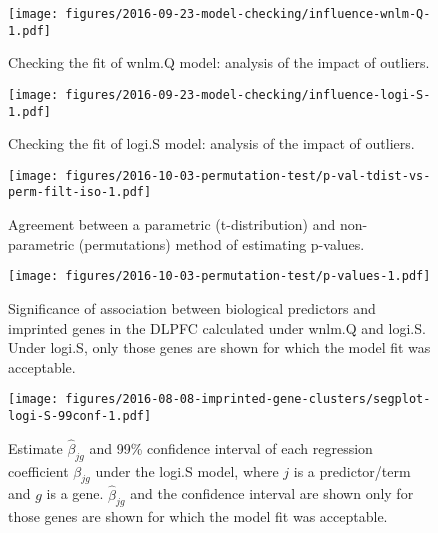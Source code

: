 \documentclass[letterpaper]{article}
\begin{document}
\begin{figure}[h]
\begin{center}
\texttt{[image: figures/2016-09-23-model-checking/influence-wnlm-Q-1.pdf]}
\end{center}
\caption{
Checking the fit of wnlm.Q model: analysis of the impact of outliers.
}
\label{fig:influence-wnlm.Q}
\end{figure}

\begin{figure}[h]
\begin{center}
\texttt{[image: figures/2016-09-23-model-checking/influence-logi-S-1.pdf]}
\end{center}
\caption{
Checking the fit of logi.S model: analysis of the impact of outliers.
}
\label{fig:influence-logi.S}
\end{figure}

\begin{figure}[h]
\begin{center}
\texttt{[image: figures/2016-10-03-permutation-test/p-val-tdist-vs-perm-filt-iso-1.pdf]}
\end{center}
\caption{Agreement between a parametric (t-distribution) and non-parametric
(permutations) method of estimating p-values.}
\label{fig:pval-tdist-vs-perm}
\end{figure}

\begin{figure}[h]
\begin{center}
\texttt{[image: figures/2016-10-03-permutation-test/p-values-1.pdf]}
\end{center}
\caption{
Significance of association between biological predictors and imprinted genes
in the DLPFC calculated under wnlm.Q and logi.S.  Under logi.S, only those
genes are shown for which the model fit was acceptable.
}
\label{fig:pval}
\end{figure}

\begin{figure}[h]
\begin{center}
\texttt{[image: figures/2016-08-08-imprinted-gene-clusters/segplot-logi-S-99conf-1.pdf]}
\end{center}
\caption{
Estimate \(\hat{\beta}_{jg}\) and 99\% confidence interval of each regression coefficient
\(\beta_{jg}\) under the logi.S model, where \(j\) is a predictor/term and
\(g\) is a gene.  \(\hat{\beta}_{jg}\) and the confidence interval are shown only for those
genes are shown for which the model fit was acceptable.
}
\label{fig:biol-effects-logi.S}
\end{figure}
\end{document}

